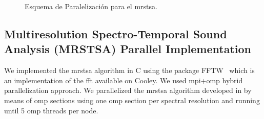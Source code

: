 {\begin{figure}[tb] 
    \centering
    \hfill
	\caption{Esquema de Paralelización para el \gls{mrstsa}.}
  \label{fig:MRSTSA_Parallelization} 
\end{figure}
}{
\subsection{Multiresolution Spectro-Temporal Sound Analysis (MRSTSA) Parallel Implementation}

We implemented the \gls{mrstsa} algorithm in C using the package FFTW~\cite{fftw} which is an implementation of the \gls{fft} available on Cooley. We used \gls{mpi}+\gls{omp} hybrid parallelization approach. We parallelized the \gls{mrstsa} algorithm developed in \cite{10.1371/journal.pone.0217966} by means of \gls{omp} sections using one \gls{omp} section per spectral resolution and running until 5 \gls{omp} threads per node.

}
